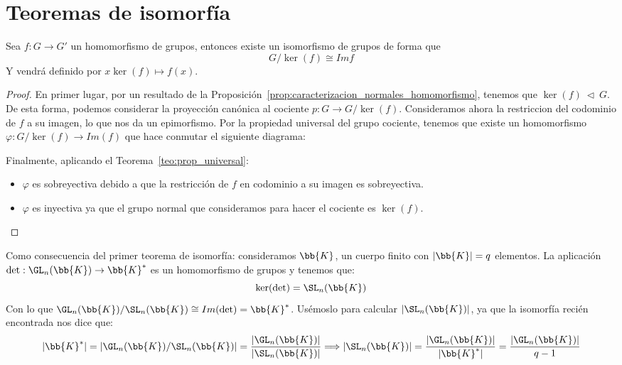 \section{Teoremas de isomorfía}
\begin{teo}
    Sea $f:G\to G'$ un homomorfismo de grupos, entonces existe un isomorfismo de grupos de forma que
    \begin{equation*}
        G/\ker(f) \cong Imf
    \end{equation*}
    Y vendrá definido por $x\ker(f) \longmapsto f(x)$.
    \begin{proof}
        En primer lugar, por un resultado de la Proposición~\ref{prop:caracterizacion_normales_homomorfismo}, tenemos que ${\ker(f)\ \lhd\ G}$. De esta forma, podemos considerar la proyección canónica al cociente $p:G\to G/\ker(f)$. Consideramos ahora la restriccion del codominio de $f$ a su imagen, lo que nos da un epimorfismo. Por la propiedad universal del grupo cociente, tenemos que existe un homomorfismo $\varphi:G/\ker(f)\to Im(f)$ que hace conmutar el siguiente diagrama:
    \begin{figure}[H]
        \centering
    \end{figure}
    Finalmente, aplicando el Teorema~\ref{teo:prop_universal}:
    \begin{itemize}
        \item $\varphi$ es sobreyectiva debido a que la restricción de $f$ en codominio a su imagen es sobreyectiva.
        \item $\varphi$ es inyectiva ya que el grupo normal que consideramos para hacer el cociente es $\ker(f)$.\qedhere
    \end{itemize}
    \end{proof}
\end{teo}

\begin{ejemplo}
    Como consecuencia del primer teorema de isomorfía: consideramos $\bb{K}$, un cuerpo finito con $|\bb{K}| = q$ elementos. La aplicación $\det:\GL_n(\bb{K})\to \bb{K}^\ast$ es un homomorfismo de grupos y tenemos que:
    \begin{equation*}
        \ker(\det) = \SL_n(\bb{K})
    \end{equation*}
    Con lo que $\GL_n(\bb{K})/\SL_n(\bb{K}) \cong Im(\det) = \bb{K}^\ast$. Usémoslo para calcular $|\SL_n(\bb{K})|$, ya que la isomorfía recién encontrada nos dice que:
    \begin{equation*}
        |\bb{K}^\ast| = |\GL_n(\bb{K})/\SL_n(\bb{K})| = \dfrac{|\GL_n(\bb{K})|}{|\SL_n(\bb{K})|} \Longrightarrow |\SL_n(\bb{K})| = \dfrac{|\GL_n(\bb{K})|}{|\bb{K}^\ast|} = \dfrac{|\GL_n(\bb{K})|}{q-1}
    \end{equation*}
\end{ejemplo}

